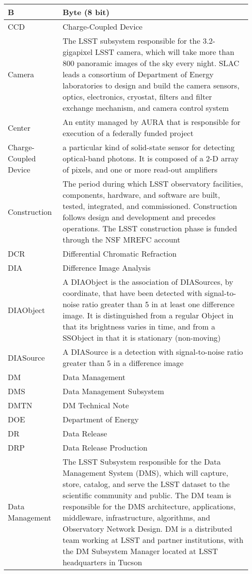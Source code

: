 \begin{longtable}{|p{}|p{}|}
B & Byte (8 bit) \\\hline
CCD & \gls{Charge-Coupled Device} \\\hline
Camera & The \gls{LSST} subsystem responsible for the 3.2-gigapixel \gls{LSST} \gls{camera}, which will take more than 800 panoramic images of the sky every night. \gls{SLAC} leads a consortium of \gls{Department of Energy} laboratories to design and build the \gls{camera} sensors, optics, electronics, cryostat, filters and filter exchange mechanism, and \gls{camera} control system \\\hline
Center & An entity managed by \gls{AURA} that is responsible for execution of a federally funded project \\\hline
Charge-Coupled Device & a particular kind of solid-state sensor for detecting optical-band photons. It is composed of a 2-D array of pixels, and one or more read-out amplifiers \\\hline
Construction & The period during which \gls{LSST} observatory facilities, components, hardware, and software are built, tested, integrated, and commissioned. \gls{Construction} follows design and development and precedes operations. The \gls{LSST} construction phase is funded through the \gls{NSF} \gls{MREFC} account \\\hline
DCR & \gls{Differential Chromatic Refraction} \\\hline
DIA & \gls{Difference Image Analysis} \\\hline
DIAObject & A \gls{DIAObject} is the association of DIASources, by coordinate, that have been detected with signal-to-noise ratio greater than 5 in at least one difference image. It is distinguished from a regular Object in that its brightness varies in time, and from a SSObject in that it is stationary (non-moving) \\\hline
DIASource & A \gls{DIASource} is a detection with signal-to-noise ratio greater than 5 in a difference image \\\hline
DM & \gls{Data Management} \\\hline
DMS & \gls{Data Management} \gls{Subsystem} \\\hline
DMTN & \gls{DM} Technical Note \\\hline
DOE & \gls{Department of Energy} \\\hline
DR & \gls{Data Release} \\\hline
DRP & \gls{Data Release Production} \\\hline
Data Management & The \gls{LSST} Subsystem responsible for the \gls{Data Management} System (\gls{DMS}), which will capture, store, catalog, and serve the \gls{LSST} dataset to the scientific community and public. The \gls{DM} team is responsible for the \gls{DMS} architecture, applications, middleware, infrastructure, algorithms, and Observatory Network Design. \gls{DM} is a distributed team working at \gls{LSST} and partner institutions, with the \gls{DM} \gls{Subsystem Manager} located at \gls{LSST} headquarters in Tucson \\\hline

\end{longtable}
